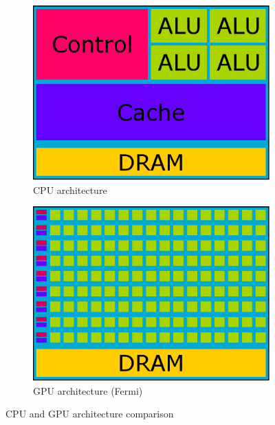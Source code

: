 \begin{description}
\begin{figure}[h]
\centering
\begin{subfigure}{.5\textwidth}
  \centering
  \includegraphics[width=.8\linewidth]{img/CPUarchitecture.eps}
  \caption{CPU architecture}
  \label{fig:cpuarchitecture}
\end{subfigure}
\begin{subfigure}{.5\textwidth}
  \centering
  \includegraphics[width=.8\linewidth]{img/GPUarchitecture.eps}
  \caption{GPU architecture (Fermi)}
  \label{fig:gpuarchitecture}
\end{subfigure}
\caption{CPU and GPU architecture comparison}
\end{figure}

\end{description}
